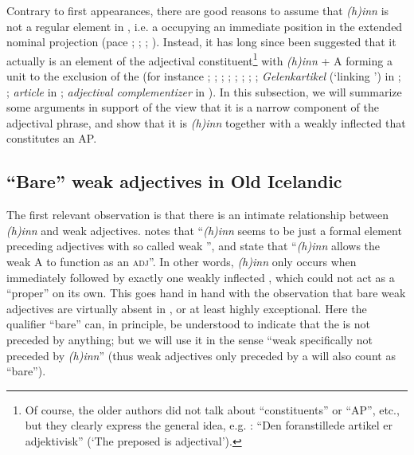 \documentclass[output=paper,colorlinks,citecolor=brown]{langscibook}
\begin{document}
Contrary to first appearances, there are good reasons to assume that  \textit{(h)inn} is not a regular  element in , i.e. a    occupying an immediate position in the extended nominal projection (pace 
\citealt{RoehrsSapp2004}; \citealt{Faarlund04,Faarlund2007,Faarlund2009}; \citealt{Laake2007}; \citealt{Lohndal2007}). Instead, it has long since been suggested that it  actually is an element of the adjectival constituent\footnote{Of course, the older authors did not talk about ``constituents'' or ``AP'', etc., but they clearly express the general idea, e.g. \citet[48]{Nygaard05}: ``Den foranstillede artikel er adjektivisk'' (`The preposed  is adjectival'). } with \textit{(h)inn} + A forming a unit to the exclusion of the    
  (for instance \citealt{Nygaard05}; \citealt{Lundeby1965}; \citealt{Perridon96}; \citealt{Skrzypek2009,Skrzypek2010}; \citealt{PerridonSleeman2011}; \citealt{Ulla2009,Ulla2015}; \citealt{BorjarsPayne2016}; \citealt{Borjarsetal16};   \textit{Gelenkartikel} (`linking ') in \citealt{Heinrichs54}; \citealt{Himmelmann97}; \textit{ article} in  \citealt{Riessler2016};  \textit{adjectival complementizer} in \citealt{Pfaff2019}).   
In this subsection, we will summarize some arguments in support of the view that it is  a narrow component of the adjectival phrase, and show that it is \textit{(h)inn} together with a weakly inflected  that  constitutes an AP.  





\subsection{ ``Bare'' weak adjectives in Old Icelandic}
\label{sec:9:bare}

The first relevant observation is that there is an intimate relationship between \textit{(h)inn} and weak adjectives. \citet[7]{Ulla2009} notes that ``\textit{(h)inn} seems to be just a formal element preceding adjectives with so called weak '', and \citet[3]{BorjarsPayne2016} state that ``\textit{(h)inn} allows the weak A to function as an  \textsc{adj}''. In other words, \textit{(h)inn} only occurs when immediately followed by exactly one weakly inflected , which could not act as a ``proper''  on its own.   
This goes hand in hand with the observation that  bare weak adjectives  are virtually absent in , or at least highly exceptional. Here the qualifier ``bare'' can, in principle, be understood to indicate that the  is not preceded by anything;  but we will use it in the sense ``weak  specifically not preceded by \textit{(h)inn}'' (thus weak adjectives only preceded by a  will also count as ``bare''). 
\end{document}
